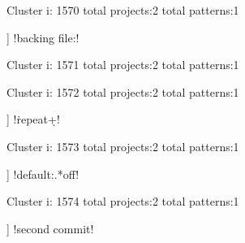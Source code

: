 Cluster i: 1570
total projects:2
total patterns:1
\begin{multicols}{1}
\begin{description}[noitemsep,topsep=0pt]
\item [[2] ] \cverb!backing file:!
\end{description}
\end{multicols}







Cluster i: 1571
total projects:2
total patterns:1
\begin{multicols}{1}
\end{multicols}







Cluster i: 1572
total projects:2
total patterns:1
\begin{multicols}{1}
\begin{description}[noitemsep,topsep=0pt]
\item [[2] ] \cverb!\.repeat\d+!
\end{description}
\end{multicols}







Cluster i: 1573
total projects:2
total patterns:1
\begin{multicols}{1}
\begin{description}[noitemsep,topsep=0pt]
\item [[2] ] \cverb!default:.*off!
\end{description}
\end{multicols}







Cluster i: 1574
total projects:2
total patterns:1
\begin{multicols}{1}
\begin{description}[noitemsep,topsep=0pt]
\item [[2] ] \cverb!second commit!
\end{description}
\end{multicols}







